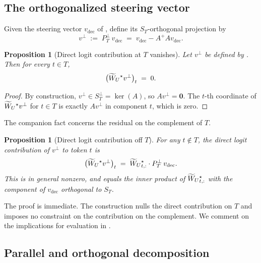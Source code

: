 \documentclass[11pt,letterpaper]{article}
\theoremstyle{plain}
\newtheorem{proposition}[theorem]{Proposition}
\theoremstyle{definition}
\newcommand{\1}{\mathbf{1}}
\newcommand{\zero}{\mathbf{0}}
\newcommand{\WUt}{\widetilde{W}_{U}\mathchoice{}{}{}{}}
\newcommand{\vdec}{v_{\text{dec}}}
\newcommand{\vperp}{v^{\perp}}
\newcommand{\PTperp}{P_{T}^{\perp}}
\begin{document}
\subsection{The orthogonalized steering vector}

Given the steering vector $\vdec$ of , define its $S_T$-orthogonal projection by
\begin{equation}
\vperp \;:=\; \PTperp \,\vdec \;=\; \vdec - A^+ A \vdec.
\label{eq:vperp}
\end{equation}

\begin{proposition}[Direct logit contribution at $T$ vanishes]\label{prop:zerodirect}
Let $\vperp$ be defined by . Then for every $t \in T$,
\begin{equation}
\big(\WUt^\star \vperp\big)_t \;=\; 0.
\label{eq:directzero}
\end{equation}
\end{proposition}

\begin{proof}
By construction, $\vperp \in S_T^\perp = \ker(A)$, so $A \vperp = \zero$. The $t$-th coordinate of $\WUt^\star \vperp$ for $t \in T$ is exactly $A \vperp$ in component $t$, which is zero.
\end{proof}

The companion fact concerns the residual on the complement of $T$.

\begin{proposition}[Direct logit contribution off $T$]\label{prop:offT}
For any $t \notin T$, the direct logit contribution of $\vperp$ to token $t$ is
\begin{equation}
\big(\WUt^\star \vperp\big)_t \;=\; \WUt^\star_{t,:} \cdot \PTperp \,\vdec.
\label{eq:offTcontribution}
\end{equation}
This is in general nonzero, and equals the inner product of $\WUt^\star_{t,:}$ with the component of $\vdec$ orthogonal to $S_T$.
\end{proposition}

The proof is immediate. The construction nulls the direct contribution on $T$ and imposes no constraint on the contribution on the complement. We comment on the implications for evaluation in .

\subsection{Parallel and orthogonal decomposition}
\end{document}
